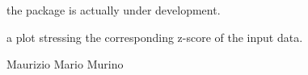 \documentclass[a4paper]{book}
\begin{document}
%
\begin{Details}\relax
the package is actually under development.
\end{Details}
%
\begin{Value}
a plot stressing the corresponding z-score of the input data.
\end{Value}
%
\begin{Author}\relax
Maurizio Mario Murino
\end{Author}
%
\begin{SeeAlso}\relax
{}
\end{SeeAlso}
\printindex{}
\end{document}
